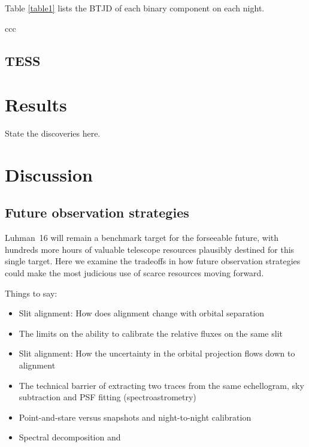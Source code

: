 \documentclass[modern]{aastex631}
\begin{document}
Table \ref{table1} lists the BTJD of each binary component on each night.

\begin{deluxetable}{ccc}
  \startdata
  
  \enddata

\end{deluxetable}

\subsection{TESS}


\section{Results}
State the discoveries here.

\section{Discussion}

\subsection{Future observation strategies}
Luhman~16 will remain a benchmark target for the forseeable future, with hundreds more hours of valuable telescope resources plausibly destined for this single target.  Here we examine the tradeoffs in how future observation strategies could make the most judicious use of scarce resources moving forward.

Things to say:  
\begin{itemize}
  \item Slit alignment: How does alignment change with orbital separation
  \item The limits on the ability to calibrate the relative fluxes on the same slit
  \item Slit alignment: How the uncertainty in the orbital projection flows down to alignment
  \item The technical barrier of extracting two traces from the same echellogram, sky subtraction and PSF fitting (spectroastrometry)
  \item Point-and-stare versus snapshots and night-to-night calibration
  \item Spectral decomposition and 
\end{itemize}
\end{document}
